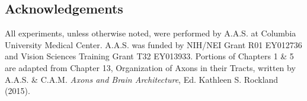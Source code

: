 \subsection*{Acknowledgements}
\label{subsec:acknowledgements}
All experiments, unless otherwise noted, were performed by A.A.S. at Columbia University Medical Center. 
A.A.S. was funded by NIH/NEI Grant R01 EY012736 and Vision Sciences Training Grant T32 EY013933.
Portions of Chapters 1 \& 5 are adapted from Chapter 13, Organization of Axons in their Tracts, written by A.A.S. \& C.A.M. \emph{Axons and Brain Architecture}, Ed. Kathleen S. Rockland (2015).
